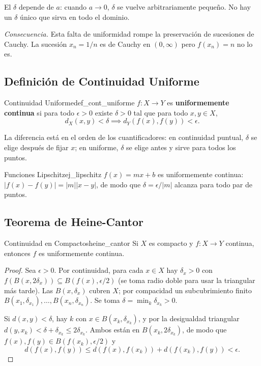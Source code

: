 \documentclass[11pt, a4paper]{article}
\begin{document}
El $\delta$ depende de $a$: cuando $a \to 0$, $\delta$ se vuelve arbitrariamente pequeño. No hay un
$\delta$ único que sirva en todo el dominio.

\textit{Consecuencia.} Esta falta de uniformidad rompe la preservación de sucesiones de Cauchy. La
sucesión $x_n = 1/n$ es de Cauchy en $(0, \infty)$ pero $f(x_n) = n$ no lo es.

\subsection{Definición de Continuidad Uniforme}

\begin{definicion}{Continuidad Uniforme}{def_cont_uniforme}
$f: X \to Y$ es \textbf{uniformemente continua} si para todo $\epsilon > 0$ existe $\delta > 0$ tal que para
todo $x, y \in X$,
$$ d_X(x, y) < \delta \implies d_Y(f(x), f(y)) < \epsilon. $$
\end{definicion}

La diferencia está en el orden de los cuantificadores: en continuidad puntual, $\delta$ se elige
después de fijar $x$; en uniforme, $\delta$ se elige antes y sirve para todos los puntos.

\begin{ejemplo}{Funciones Lipschitz}{ej_lipschitz}
$f(x) = mx + b$ es uniformemente continua: $|f(x) - f(y)| = |m||x-y|$, de modo que
$\delta = \epsilon/|m|$ alcanza para todo par de puntos.
\end{ejemplo}

\subsection{Teorema de Heine-Cantor}

\begin{teorema}{Continuidad en Compactos}{heine_cantor}
Si $X$ es compacto y $f: X \to Y$ continua, entonces $f$ es uniformemente continua.
\end{teorema}

\begin{proof}
Sea $\epsilon > 0$. Por continuidad, para cada $x \in X$ hay $\delta_x > 0$ con
$f(B(x, 2\delta_x)) \subseteq B(f(x), \epsilon/2)$ (se toma radio doble para usar la triangular más
tarde). Las $B(x, \delta_x)$ cubren $X$; por compacidad un subcubrimiento finito
$B(x_1, \delta_{x_1}), \dots, B(x_n, \delta_{x_n})$. Se toma $\delta = \min_k \delta_{x_k} > 0$.

Si $d(x, y) < \delta$, hay $k$ con $x \in B(x_k, \delta_{x_k})$, y por la desigualdad triangular
$d(y, x_k) < \delta + \delta_{x_k} \le 2\delta_{x_k}$. Ambos están en $B(x_k, 2\delta_{x_k})$,
de modo que $f(x), f(y) \in B(f(x_k), \epsilon/2)$ y
$$ d(f(x), f(y)) \le d(f(x), f(x_k)) + d(f(x_k), f(y)) < \epsilon. $$
\end{proof}
\end{document}
